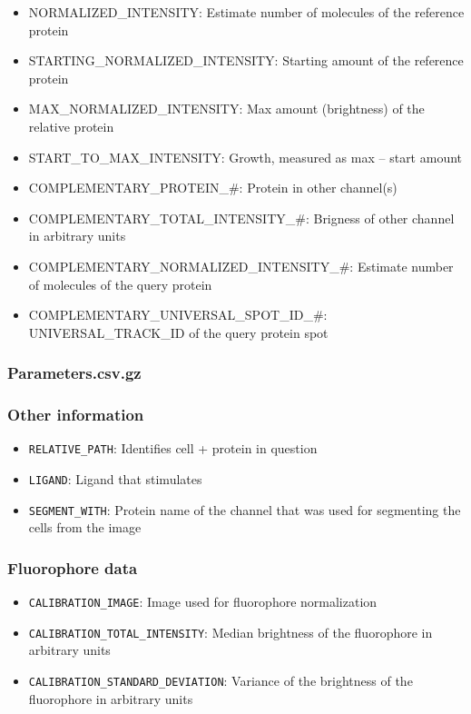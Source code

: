 \begin{itemize}
    \item NORMALIZED\_INTENSITY: Estimate number of molecules of the reference protein
    \item STARTING\_NORMALIZED\_INTENSITY: Starting amount of the reference protein
    \item MAX\_NORMALIZED\_INTENSITY: Max amount (brightness) of the relative protein
    \item START\_TO\_MAX\_INTENSITY: Growth, measured as max – start amount
    \item COMPLEMENTARY\_PROTEIN\_\#: Protein in other channel(s)
    \item COMPLEMENTARY\_TOTAL\_INTENSITY\_\#: Brigness of other channel in arbitrary units
    \item COMPLEMENTARY\_NORMALIZED\_INTENSITY\_\#: Estimate number of molecules of the query protein
    \item COMPLEMENTARY\_UNIVERSAL\_SPOT\_ID\_\#: UNIVERSAL\_TRACK\_ID of the query protein spot
\end{itemize}


\subsubsection*{Parameters.csv.gz}

\subsubsection*{Other information}
\begin{itemize}
    \item \texttt{RELATIVE\_PATH}: Identifies cell + protein in question
    \item \texttt{LIGAND}: Ligand that stimulates 
    \item \texttt{SEGMENT\_WITH}: Protein name of the channel that was used for segmenting the cells from the image
\end{itemize}

\subsubsection*{Fluorophore data}
\begin{itemize}
    \item \texttt{CALIBRATION\_IMAGE}: Image used for fluorophore normalization
    \item \texttt{CALIBRATION\_TOTAL\_INTENSITY}: Median brightness of the fluorophore in arbitrary units
    \item \texttt{CALIBRATION\_STANDARD\_DEVIATION}: Variance of the brightness of the fluorophore in arbitrary units
\end{itemize}

